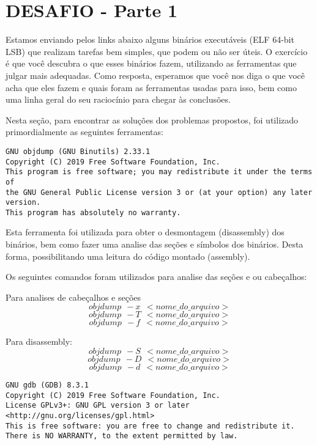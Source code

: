 \section{DESAFIO - Parte 1} \label{sec:desafio1}

Estamos enviando pelos links abaixo alguns binários executáveis (ELF
64-bit LSB) que realizam tarefas bem simples, que podem ou não ser
úteis. O exercício é que você descubra o que esses binários fazem,
utilizando as ferramentas que julgar mais adequadas. Como resposta,
esperamos que você nos diga o que você acha que eles fazem e quais
foram as ferramentas usadas para isso, bem como uma linha geral do seu
raciocínio para chegar às conclusões.\\

\par Nesta seção, para encontrar as soluções dos problemas propostos, foi
utilizado primordialmente as seguintes ferramentas:

\begin{verbatim}
GNU objdump (GNU Binutils) 2.33.1
Copyright (C) 2019 Free Software Foundation, Inc.
This program is free software; you may redistribute it under the terms of
the GNU General Public License version 3 or (at your option) any later version.
This program has absolutely no warranty.
\end{verbatim}

Esta ferramenta foi utilizada para obter o desmontagem (disassembly)
dos binários, bem como fazer uma analise das seções e símbolos dos
binários. Desta forma, possibilitando uma leitura do código montado
(assembly).

Os seguintes comandos foram utilizados para analise das seções e ou
cabeçalhos:

Para analises de cabeçalhos e seções\\
$$objdump \ \ -x \ \ <nome\_do\_arquivo>$$
$$objdump \ \ -T \ \ <nome\_do\_arquivo>$$
$$objdump \ \ -f \ \ <nome\_do\_arquivo>$$

Para disassembly:\\
$$objdump \ \ -S \ \ <nome\_do\_arquivo>$$
$$objdump \ \ -D \ \ <nome\_do\_arquivo>$$
$$objdump \ \ -d \ \ <nome\_do\_arquivo>$$

\begin{verbatim}
GNU gdb (GDB) 8.3.1
Copyright (C) 2019 Free Software Foundation, Inc.
License GPLv3+: GNU GPL version 3 or later <http://gnu.org/licenses/gpl.html>
This is free software: you are free to change and redistribute it.
There is NO WARRANTY, to the extent permitted by law.
\end{verbatim}

